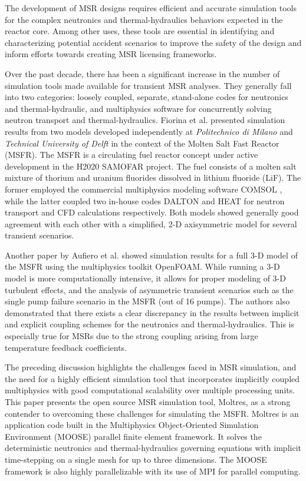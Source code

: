 The development of MSR designs requires efficient and accurate simulation tools
for the complex neutronics and thermal-hydraulics behaviors expected in the
reactor core. Among other uses, these tools are essential in identifying and
characterizing potential accident scenarios to improve the safety of the design
and inform efforts towards creating MSR licensing frameworks.

Over the past decade, there has been a significant increase in the number of
simulation tools made available for transient MSR analyses. They generally fall
into two categories: loosely coupled, separate, stand-alone codes for
neutronics and thermal-hydraulic, and multiphysics software for concurrently
solving neutron transport and thermal-hydraulics. Fiorina et al.
\cite{fiorina_modelling_2014} presented simulation results from two
models developed independently at \textit{Politechnico di Milano} and
\textit{Technical University of Delft} in the context of the Molten Salt Fast
Reactor (MSFR). The MSFR is a circulating fuel reactor concept under active
development in the H2020 SAMOFAR project. The fuel consists of a molten salt
mixture of thorium and uranium fluorides dissolved in lithium fluoride (LiF).
The former employed the commercial
multiphysics modeling software COMSOL \cite{comsol_comsol_nodate}, while the
latter coupled two in-house codes DALTON and HEAT for neutron transport and
CFD calculations respectively. Both models showed generally good agreement with
each other with a simplified, 2-D axisymmetric model for several transient
scenarios.

Another paper by Aufiero et al. showed simulation results for a full 3-D model
of the MSFR using the multiphysics toolkit OpenFOAM. While running a 3-D model
is more computationally intensive, it allows for proper modeling of 3-D
turbulent effects, and the analysis of asymmetric transient scenarios such as
the single pump failure scenario in the MSFR (out of 16
pumps). The authors also demonstrated that there exists a clear discrepancy in
the results between implicit and explicit coupling schemes for the neutronics
and thermal-hydraulics. This is especially true for MSRs due to the strong
coupling arising from large temperature feedback coefficients. 

The preceding discussion highlights the challenges faced in MSR simulation, and
the need for a highly efficient simulation tool that incorporates implicitly
coupled multiphysics with good computational scalability over multiple
processing units. This paper presents the open source MSR simulation tool,
Moltres, as a strong contender to overcoming these challenges for simulating
the MSFR. Moltres is an application code
built in the Multiphysics Object-Oriented Simulation Environment (MOOSE)
parallel finite element framework. It solves the deterministic neutronics and
thermal-hydraulics governing equations with implicit
time-stepping on a single mesh for up to three dimensions. The MOOSE framework
is also highly parallelizable with its use of MPI for parallel computing.

